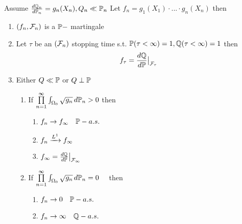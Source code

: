 \begin{thm}[Kakutani] \label{Kakutani}
Assume $\frac{\mathop{}\!d \mathbb{Q}_n}{\mathop{}\!d \mathbb{P}_n} = g_n(X_n), Q_n \ll \mathbb{P}_n$ Let $f_n = g_1(X_1) \cdot ... \cdot g_n(X_n)$ then 
\begin{enumerate}
    \item $(f_n, \mathcal{F}_n)$ is a $\mathbb{P}-$ martingale
    \item Let $\tau$ be an $(\mathcal{F}_n)$ stopping time s.t. $\mathbb{P}(\tau < \infty) =1, \mathbb{Q}(\tau < \infty) =1$ then 
    \begin{equation*}
        f_\tau = \frac{\mathop{}\!d \mathbb{Q}}{\mathop{}\!d \mathbb{P}}\big|_{\mathcal{F}_\tau}
    \end{equation*}
    \item Either $Q \ll \mathbb{P}$ or $Q \perp \mathbb{P}$
    \begin{enumerate}
        \item If $\prod\limits_{n=1}^\infty \int_{\Omega_0} \sqrt{g_n} \mathop{}\!d \mathbb{P}_n >0$ then
        \begin{enumerate}
            \item $f_n \rightarrow f_\infty \quad \mathbb{P}-a.s.$
            \item $f_n \xrightarrow{L^{1}} f_\infty$
            \item $f_\infty = \frac{\mathop{}\!d \mathbb{Q}}{\mathop{}\!d \mathbb{P}}\big|_{\mathcal{F}_\infty}$
        \end{enumerate}
        \item If $\prod\limits_{n=1}^\infty \int_{\Omega_0} \sqrt{g_n} \mathop{}\!d \mathbb{P}_n =0\quad$ then
        \begin{enumerate}
            \item $f_n \rightarrow 0 \quad \mathbb{P}-a.s.$
            \item $f_n \rightarrow \infty \quad \mathbb{Q}-a.s.$
        \end{enumerate}
    \end{enumerate}
\end{enumerate}
\end{thm}

